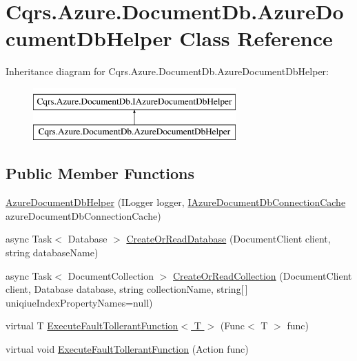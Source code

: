 \hypertarget{classCqrs_1_1Azure_1_1DocumentDb_1_1AzureDocumentDbHelper}{}\section{Cqrs.\+Azure.\+Document\+Db.\+Azure\+Document\+Db\+Helper Class Reference}
\label{classCqrs_1_1Azure_1_1DocumentDb_1_1AzureDocumentDbHelper}
Inheritance diagram for Cqrs.\+Azure.\+Document\+Db.\+Azure\+Document\+Db\+Helper\+:\begin{figure}[H]
\begin{center}
\leavevmode
\includegraphics[height=2.000000cm]{classCqrs_1_1Azure_1_1DocumentDb_1_1AzureDocumentDbHelper}
\end{center}
\end{figure}
\subsection*{Public Member Functions}
\begin{DoxyCompactItemize}
\item 
\hyperlink{classCqrs_1_1Azure_1_1DocumentDb_1_1AzureDocumentDbHelper_af6557961f9bfc7685a1197d5fd40a35e}{Azure\+Document\+Db\+Helper} (I\+Logger logger, \hyperlink{interfaceCqrs_1_1Azure_1_1DocumentDb_1_1IAzureDocumentDbConnectionCache}{I\+Azure\+Document\+Db\+Connection\+Cache} azure\+Document\+Db\+Connection\+Cache)
\item 
async Task$<$ Database $>$ \hyperlink{classCqrs_1_1Azure_1_1DocumentDb_1_1AzureDocumentDbHelper_ad16ab0ecb4524057ddb2f8e67043179f}{Create\+Or\+Read\+Database} (Document\+Client client, string database\+Name)
\item 
async Task$<$ Document\+Collection $>$ \hyperlink{classCqrs_1_1Azure_1_1DocumentDb_1_1AzureDocumentDbHelper_a5dd4b71b321017034c3d5c651017a068}{Create\+Or\+Read\+Collection} (Document\+Client client, Database database, string collection\+Name, string\mbox{[}$\,$\mbox{]} uniqiue\+Index\+Property\+Names=null)
\item 
virtual T \hyperlink{classCqrs_1_1Azure_1_1DocumentDb_1_1AzureDocumentDbHelper_a470fcc86befa4a28725ad53e715a223c}{Execute\+Fault\+Tollerant\+Function$<$ T $>$} (Func$<$ T $>$ func)
\item 
virtual void \hyperlink{classCqrs_1_1Azure_1_1DocumentDb_1_1AzureDocumentDbHelper_a334337444ff416c9f4ce48ec61e60a83}{Execute\+Fault\+Tollerant\+Function} (Action func)
\end{DoxyCompactItemize}
